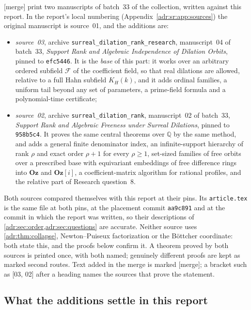 \documentclass[11pt,letterpaper]{article}
\numberwithin{equation}{section}
\theoremstyle{definition}
\theoremstyle{remark}
\newcommand{\Oz}{\mathbf{Oz}}
\newcommand{\Goz}{\mathbf{Oz}[i]}
\newcommand{\Q}{\mathbb Q}
\newcommand{\mtag}{\textup{[merge]}}%
\newcommand{\src}[1]{\textup{[#1]}}%
\begin{document}
\mtag{} 
print two manuscripts of batch~33 of the collection, written against this
report. In the report's local numbering (Appendix~\ref{adr:sr:app:sources})
the original manuscript is source~01, and the additions are:
\begin{itemize}[leftmargin=*,itemsep=3pt]
\item \emph{source~03}, archive \texttt{surreal\_dilation\_rank\_research},
manuscript~04 of batch~33, \emph{Support Rank and Algebraic Independence of
Dilation Orbits}, pinned to \texttt{efc5446}. It is the \emph{base} of this
part: it works over an arbitrary ordered subfield $\mathcal F$ of the
coefficient field, so that real dilations are allowed, relative to a full
Hahn subfield $K_H(k)$, and it adds ordinal families, a uniform tail beyond
any set of parameters, a prime-field formula and a polynomial-time
certificate;
\item \emph{source~02}, archive \texttt{surreal\_dilation\_rank}, manuscript~02
of batch~33, \emph{Support Rank and Algebraic Freeness under Surreal
Dilations}, pinned to \texttt{958b5c4}. It proves the same central theorems
over $\Q$ by the same method, and adds a general finite denominator index, an
infinite-support hierarchy of rank $\rho$ and exact order $\rho+1$ for every
$\rho\ge1$, set-sized families of free orbits over a prescribed base with
equivariant embeddings of free difference rings into $\Oz$ and $\Goz$, a
coefficient-matrix algorithm for rational profiles, and the relative part of
Research question~8.
\end{itemize}
Both sources compared themselves with this report at their pins. Its
\texttt{article.tex} is the same file at both pins, at the placement commit
\texttt{aa9c891} and at the commit in which the report was written, so their
descriptions of \cref{adr:sec:order,adr:sec:questions} are accurate. Neither
source uses \cref{adr:thm:collapse}, Newton--Puiseux factorization or the
B\"ottcher coordinate: both state this, and the proofs below confirm it. A
theorem proved by both sources is printed once, with both named; genuinely
different proofs are kept as marked second routes. Text added in the merge is
marked \mtag; a bracket such as \src{03, 02} after a heading names the
sources that prove the statement.

\subsection{What the additions settle in this report}
\label{adr:sr:sec:answers}
\end{document}
